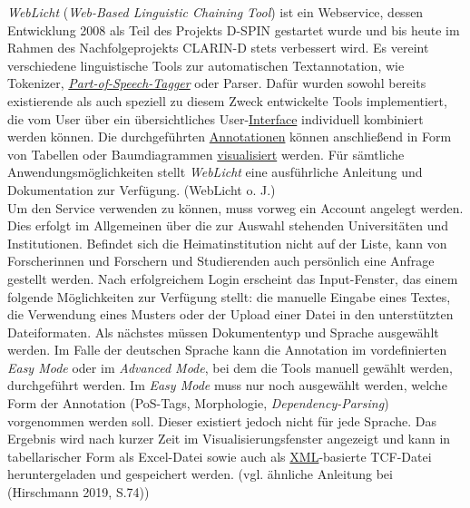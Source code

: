 \documentclass{article}
\begin{document}
    \emph{WebLicht} (\emph{Web-Based Linguistic Chaining Tool}) ist ein Webservice, dessen Entwicklung 2008 als Teil des Projekts D-SPIN gestartet wurde und bis heute im Rahmen des Nachfolgeprojekts CLARIN-D stets verbessert wird. Es vereint verschiedene linguistische Tools zur automatischen Textannotation, wie Tokenizer, \emph{\href{http://gams.uni-graz.at/o:konde.156}{Part-of-Speech-Tagger}} oder Parser. Dafür wurden sowohl bereits existierende als auch speziell zu diesem Zweck entwickelte Tools implementiert, die vom User über ein übersichtliches User-\href{http://gams.uni-graz.at/o:konde.98}{Interface} individuell kombiniert werden können. Die durchgeführten \href{http://gams.uni-graz.at/o:konde.17}{Annotationen} können anschließend in Form von Tabellen oder Baumdiagrammen \href{http://gams.uni-graz.at/o:konde.54}{visualisiert} werden. Für sämtliche Anwendungsmöglichkeiten stellt \emph{WebLicht} eine ausführliche Anleitung und Dokumentation zur Verfügung. (WebLicht o. J.)\\
            
        Um den Service verwenden zu können, muss vorweg ein Account angelegt werden. Dies erfolgt im Allgemeinen über die zur Auswahl stehenden Universitäten und Institutionen. Befindet sich die Heimatinstitution nicht auf der Liste, kann von Forscherinnen und Forschern und Studierenden auch persönlich eine Anfrage gestellt werden. Nach erfolgreichem Login erscheint das Input-Fenster, das einem folgende Möglichkeiten zur Verfügung stellt: die manuelle Eingabe eines Textes, die Verwendung eines Musters oder der Upload einer Datei in den unterstützten Dateiformaten. Als nächstes müssen Dokumententyp und Sprache ausgewählt werden. Im Falle der deutschen Sprache kann die Annotation im vordefinierten \emph{Easy Mode} oder im \emph{Advanced Mode}, bei dem die Tools manuell gewählt werden, durchgeführt werden. Im \emph{Easy Mode} muss nur noch ausgewählt werden, welche Form der Annotation (PoS-Tags, Morphologie, \emph{Dependency-Parsing}) vorgenommen werden soll. Dieser existiert jedoch nicht für jede Sprache. Das Ergebnis wird nach kurzer Zeit im Visualisierungsfenster angezeigt und kann in tabellarischer Form als Excel-Datei sowie auch als \href{http://gams.uni-graz.at/o:konde.215}{XML}-basierte TCF-Datei heruntergeladen und gespeichert werden. (vgl. ähnliche Anleitung bei (Hirschmann 2019, S.74))\\
            
\end{document}
